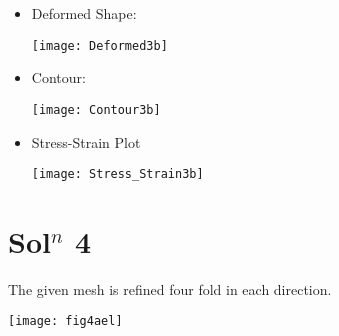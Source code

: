 \begin{itemize}
\item Deformed Shape:
\begin{center}
\texttt{[image: Deformed3b]}
\end{center} 
\newpage \item Contour: 
\begin{center}
\texttt{[image: Contour3b]}
\end{center}
\item Stress-Strain Plot
\begin{center}
\texttt{[image: Stress\_Strain3b]}
\end{center}
\end{itemize}
\newpage \section*{Sol$^n$ 4}
The given mesh is refined four fold in each direction.
\begin{center}
\texttt{[image: fig4ael]}
\end{center}
